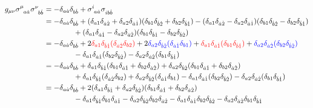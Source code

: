 \begin{align}
    g_{\mu\nu}\tensor{\sigma}{^\mu_a_{\dot a}}\tensor{\sigma}{^\nu_b_{\dot b}}&=-\delta_{a\dot a}\delta_{b\dot b}+\tensor{\sigma}{^i_a_{\dot a}}\tensor{\sigma}{_i_b_{\dot b}}\nonumber\\
    &=-\delta_{a\dot a}\delta_{b\dot b}+\qty(\delta_{a1}\delta_{\dot a\dot 2}+\delta_{a2}\delta_{\dot a\dot 1})\qty(\delta_{b1}\delta_{\dot b\dot 2}+\delta_{b2}\delta_{\dot b\dot 1})-\qty(\delta_{a1}\delta_{\dot a\dot 2}-\delta_{a2}\delta_{\dot a\dot 1})\qty(\delta_{b1}\delta_{\dot b\dot 2}-\delta_{b2}\delta_{\dot b\dot 1})\nonumber\\&\quad\quad\quad\quad+\qty(\delta_{a1}\delta_{\dot a\dot 1}-\delta_{a2}\delta_{\dot a \dot 2})\qty(\delta_{b1}\delta_{\dot b\dot 1}-\delta_{b2}\delta_{\dot b\dot 2})\nonumber\\
    &=-\delta_{a\dot a}\delta_{b\dot b}+2\textcolor{red}{\delta_{a1}\delta_{\dot b\dot 1}\qty(\delta_{\dot a\dot 2}\delta_{b2})}+2\textcolor{blue}{\delta_{a2}\delta_{\dot b\dot 2}\qty(\delta_{\dot a\dot 1}\delta_{b1})}+\textcolor{red}{\delta_{a1}\delta_{\dot a\dot 1}\qty(\delta_{b1}\delta_{\dot b\dot 1})}+\textcolor{blue}{\delta_{a2}\delta_{\dot a\dot 2}\qty(\delta_{b2}\delta_{\dot b\dot 2})}\nonumber\\
    &\quad\quad\quad\quad-\delta_{a1}\delta_{\dot a\dot 1}\qty(\delta_{b2}\delta_{\dot b \dot 2})-\delta_{a2}\delta_{\dot a\dot 2}\qty(\delta_{b1}\delta_{\dot b\dot 1})\nonumber\\
    &=-\delta_{a\dot a}\delta_{b\dot b}+\delta_{a1}\delta_{\dot b\dot 1}\qty(\delta_{b1}\delta_{\dot a\dot 1}+\delta_{b2}\delta_{\dot a\dot 2})+\delta_{a2}\delta_{\dot b\dot 2}\qty(\delta_{b1}\delta_{\dot a\dot 1}+\delta_{b2}\delta_{\dot a\dot 2})\nonumber\\
    &\quad\quad\quad\quad+\delta_{a1}\delta_{\dot b\dot 1}\qty(\delta_{\dot a\dot 2}\delta_{b2})+\delta_{a2}\delta_{\dot b\dot 2}\qty(\delta_{\dot a\dot 1}\delta_{b1})-\delta_{a1}\delta_{\dot a\dot 1}\qty(\delta_{b2}\delta_{\dot b \dot 2})-\delta_{a2}\delta_{\dot a\dot 2}\qty(\delta_{b1}\delta_{\dot b\dot 1})\nonumber\\
    &=-\delta_{a\dot a}\delta_{b\dot b}+2\qty(\delta_{a1}\delta_{\dot b\dot 1}+\delta_{a2}\delta_{\dot b\dot 2})\qty(\delta_{b1}\delta_{\dot a\dot 1}+\delta_{b2}\delta_{\dot a\dot 2})\nonumber\\
    &\quad\quad\quad\quad-\delta_{a1}\delta_{\dot b\dot 1}\delta_{b1}\delta_{\dot a\dot 1}-\delta_{a2}\delta_{\dot b\dot 2}\delta_{b2}\delta_{\dot a\dot 2}-\delta_{a1}\delta_{\dot a\dot 1}\delta_{b2}\delta_{\dot b \dot 2}-\delta_{a2}\delta_{\dot a\dot 2}\delta_{b1}\delta_{\dot b\dot 1}\nonumber\\

\end{align}
